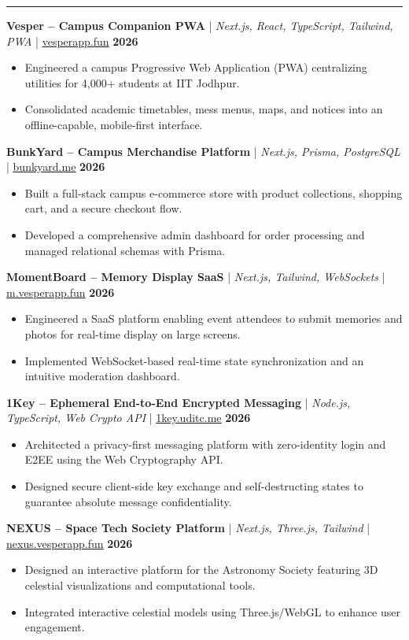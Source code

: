 \documentclass[10pt,letterpaper]{article}
\newcommand{\resumesection}[1]{%
  \vspace{5pt}
  \noindent{\large\textbf{#1}}
  \vspace{2pt}
  \hrule
  \vspace{2pt}
}
\begin{document}
\resumesection{Projects}
\noindent \textbf{Vesper -- Campus Companion PWA} | \textit{Next.js, React, TypeScript, Tailwind, PWA} | \href{https://vesperapp.fun}{\underline{vesperapp.fun}} \hfill \textbf{2026}
\begin{itemize}
    \item Engineered a campus Progressive Web Application (PWA) centralizing utilities for 4,000+ students at IIT Jodhpur.
    \item Consolidated academic timetables, mess menus, maps, and notices into an offline-capable, mobile-first interface.
\end{itemize}
\vspace{4pt}
\noindent \textbf{BunkYard -- Campus Merchandise Platform} | \textit{Next.js, Prisma, PostgreSQL} | \href{https://bunkyard.me}{\underline{bunkyard.me}} \hfill \textbf{2026}
\begin{itemize}
    \item Built a full-stack campus e-commerce store with product collections, shopping cart, and a secure checkout flow.
    \item Developed a comprehensive admin dashboard for order processing and managed relational schemas with Prisma.
\end{itemize}
\vspace{4pt}
\noindent \textbf{MomentBoard -- Memory Display SaaS} | \textit{Next.js, Tailwind, WebSockets} | \href{https://m.vesperapp.fun}{\underline{m.vesperapp.fun}} \hfill \textbf{2026}
\begin{itemize}
    \item Engineered a SaaS platform enabling event attendees to submit memories and photos for real-time display on large screens.
    \item Implemented WebSocket-based real-time state synchronization and an intuitive moderation dashboard.
\end{itemize}
\vspace{4pt}
\noindent \textbf{1Key -- Ephemeral End-to-End Encrypted Messaging} | \textit{Node.js, TypeScript, Web Crypto API} | \href{https://1key.uditc.me}{\underline{1key.uditc.me}} \hfill \textbf{2026}
\begin{itemize}
    \item Architected a privacy-first messaging platform with zero-identity login and E2EE using the Web Cryptography API.
    \item Designed secure client-side key exchange and self-destructing states to guarantee absolute message confidentiality.
\end{itemize}
\vspace{4pt}
\noindent \textbf{NEXUS -- Space Tech Society Platform} | \textit{Next.js, Three.js, Tailwind} | \href{https://nexus.vesperapp.fun}{\underline{nexus.vesperapp.fun}} \hfill \textbf{2026}
\begin{itemize}
    \item Designed an interactive platform for the Astronomy Society featuring 3D celestial visualizations and computational tools.
    \item Integrated interactive celestial models using Three.js/WebGL to enhance user engagement.
\end{itemize}
\end{document}
